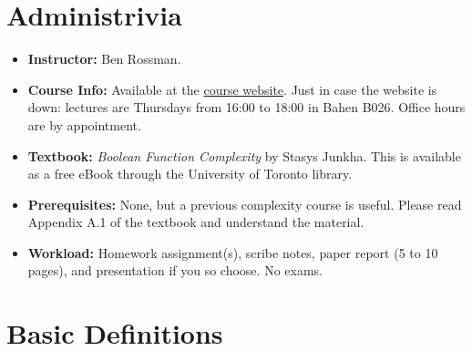 
\section{Administrivia}
\label{sec:admin}
\begin{itemize}
	\item \textbf{Instructor:} Ben Rossman. 
	\item \textbf{Course Info:} Available at the \href{http://www.math.toronto.edu/rossman/CSC2429.html}{course website}. Just in case the website is down: lectures are Thursdays from 16:00 to 18:00 in Bahen B026. Office hours are by appointment.
	\item \textbf{Textbook:} \emph{Boolean Function Complexity} by Stasys Junkha. This is available as a free eBook through the University of Toronto library. 
	\item \textbf{Prerequisites:} None, but a previous complexity course is useful. Please read Appendix A.1 of the textbook and understand the material.
	\item \textbf{Workload:} Homework assignment(s), scribe notes, paper report (5 to 10 pages), and presentation if you so choose. No exams.
\end{itemize}

\section{Basic Definitions}
